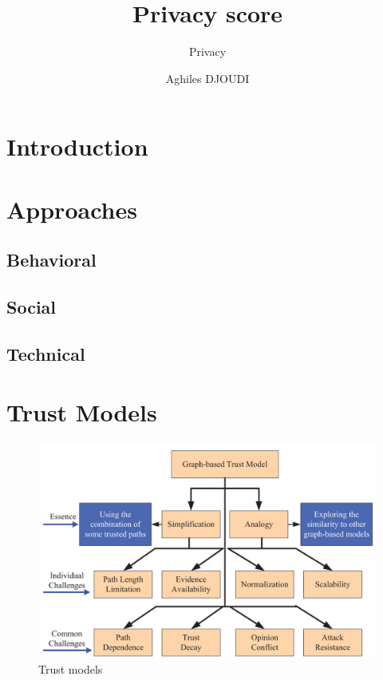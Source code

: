 \documentclass[8pt]{beamer}
\begin{document}
\title{Privacy score}
\subtitle{Privacy}
\author{Aghiles DJOUDI}

\firstpage
\tableofcontent

\section{Introduction}
\section{Approaches}
	\subsection{Behavioral}
%	
	
	
	
	
	
	
%	
	
%	
%	
	\subsection{Social}
	
	
	
	
	
	
	
	
%	
	
	
%	
%	
	\subsection{Technical}
%	
	
	
	
%	
	
%	
%	
	
	

\section{Trust Models}
\begin{frame}
		\begin{figure}
			\includegraphics[width=\columnwidth]{res/trust models.png}
			\caption{\label{fig:trust models}Trust models}
		\end{figure}
\end{frame}

\bey
\alltableofcontent

\frameBibliography
\end{document}
